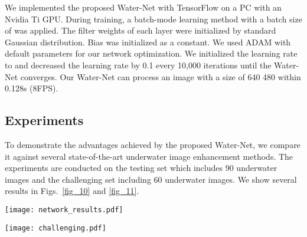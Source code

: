 \documentclass[journal]{IEEEtran}
\begin{document}
We implemented the proposed Water-Net with TensorFlow on a PC with an Nvidia Ti GPU. During training, a batch-mode learning method with a batch size of  was applied. The filter weights of each layer were initialized by standard Gaussian distribution. Bias was initialized as a constant. We used ADAM with default parameters for our network optimization. We initialized the learning rate to  and decreased the learning rate by 0.1 every 10,000 iterations until the Water-Net converges. Our Water-Net can process an image with a size of 640  480 within 0.128s (8FPS).


\subsection{Experiments}

To demonstrate the advantages achieved by the proposed Water-Net, we compare it against several state-of-the-art underwater image enhancement methods. The experiments are conducted on the testing set which includes 90 underwater images and the challenging set including 60 underwater images. We show several results in Figs.~\ref{fig_10} and \ref{fig_11}.

\begin{figure*}[!htb]
\centering
\texttt{[image: network\_results.pdf]}
\caption{Subjective comparisons on underwater images from testing set. From left to right are raw underwater images, and the results of fusion-based \cite{Ancuti2012}, retinex-based \cite{Fu2014}, histogram prior~\cite{Li2016}, blurriness-based~\cite{Peng2017}, GDCP~\cite{Peng2018}, Water CycleGAN \cite{Emerging}, Dense GAN \cite{Guo2019}, the proposed Water-Net, and reference images.}
\label{fig_10}
\end{figure*}



\begin{figure*}[!htb]
\centering
\texttt{[image: challenging.pdf]}
\caption{Subjective comparisons on underwater images from challenging set. From left to right are raw underwater images, and the results of fusion-based \cite{Ancuti2012}, retinex-based \cite{Fu2014}, histogram prior~\cite{Li2016}, blurriness-based~\cite{Peng2017}, GDCP~\cite{Peng2018}, Water CycleGAN \cite{Emerging}, Dense GAN \cite{Guo2019}, and the proposed Water-Net.}
\label{fig_11}
\end{figure*}
\end{document}
